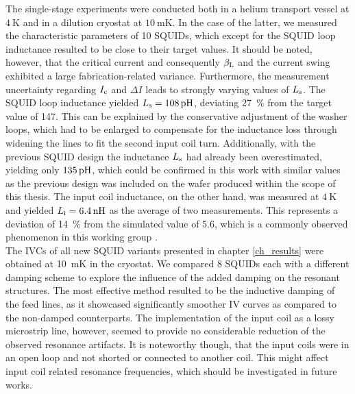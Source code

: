 The single-stage experiments were conducted both in a helium transport vessel at $\qty{4}{\kelvin}$ and in a dilution cryostat at $\qty{10}{\milli\kelvin}$. In the case of the latter, we measured the characteristic parameters of 10 SQUIDs, which except for the SQUID loop inductance resulted to be close to their target values. It should be noted, however, that the critical current and consequently $\beta_{\rm L}$ and the current swing exhibited a large fabrication-related variance. Furthermore, the measurement uncertainty regarding $I_{\rm c}$ and $\Delta I$ leads to strongly varying values of $L_{\rm s}$. The SQUID loop inductance yielded $L_{\rm s}=\qty{108}{\pH}$, deviating \qty{27}{\percent} from the target value of \qty{147}{\pH}. This can be explained by the conservative adjustment of the washer loops, which had to be enlarged to compensate for the inductance loss through widening the lines to fit the second input coil turn. Additionally, with the previous SQUID design the inductance $L_{\rm s}$ had already been overestimated, yielding only $\qty{135}{\pH}$, which could be confirmed in this work with similar values as the previous design was included on the wafer produced within the scope of this thesis. The input coil inductance, on the other hand, was measured at $\qty{4}{\kelvin}$ and yielded $L_{\rm i}=\qty{6.4}{\nH}$ as the average of two measurements. This represents a deviation of \qty{14}{\percent} from the simulated value of \qty{5.6}{\nH}, which is a commonly observed phenomenon in this working group \cite{Ferring2015, Bauer2022}. \\

The IVCs of all new SQUID variants presented in chapter \ref{ch_results} were obtained at \qty{10}{\milli\kelvin} in the cryostat. We compared 8 SQUIDs each with a different damping scheme to explore the influence of the added damping on the resonant structures. The most effective method resulted to be the inductive damping of the feed lines, as it showcased significantly smoother IV curves as compared to the non-damped counterparts. The implementation of the input coil as a lossy microstrip line, however, seemed to provide no considerable reduction of the observed resonance artifacts. It is noteworthy though, that the input coils were in an open loop and not shorted or connected to another coil. This might affect input coil related resonance frequencies, which should be investigated in future works. \\

